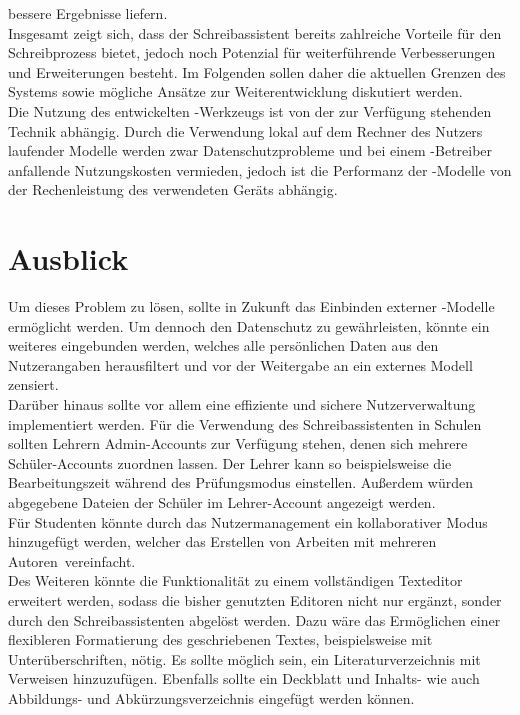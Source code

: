 \documentclass[../main.tex]{subfiles}
\begin{document}
bessere Ergebnisse liefern.\\
Insgesamt zeigt sich, dass der Schreibassistent bereits zahlreiche Vorteile für den Schreibprozess bietet, jedoch noch Potenzial für weiterführende Verbesserungen und Erweiterungen 
besteht. Im Folgenden sollen daher die aktuellen Grenzen des Systems sowie mögliche Ansätze zur Weiterentwicklung diskutiert werden.\\
Die Nutzung des entwickelten -Werkzeugs ist von der zur Verfügung stehenden Technik abhängig. Durch die Verwendung lokal auf dem Rechner des Nutzers laufender Modelle werden zwar 
Datenschutzprobleme und bei einem -Betreiber anfallende Nutzungskosten vermieden, jedoch ist die Performanz der -Modelle von der Rechenleistung des verwendeten Geräts abhängig. 


\section{Ausblick}
Um dieses Problem zu lösen, sollte in Zukunft das Einbinden externer -Modelle ermöglicht werden. Um dennoch den Datenschutz zu gewährleisten, könnte ein weiteres 
eingebunden werden, welches alle persönlichen Daten aus den Nutzerangaben herausfiltert und vor der Weitergabe an ein externes Modell zensiert.\\ 
Darüber hinaus sollte vor allem eine effiziente und sichere Nutzerverwaltung implementiert werden. Für die Verwendung des Schreibassistenten in Schulen sollten Lehrern Admin-Accounts 
zur Verfügung stehen, denen sich mehrere Schüler-Accounts zuordnen lassen. Der Lehrer kann so beispielsweise die Bearbeitungszeit während des Prüfungsmodus einstellen. Außerdem 
würden abgegebene Dateien der Schüler im Lehrer-Account angezeigt werden.\\
Für Studenten könnte durch das Nutzermanagement ein kollaborativer Modus hinzugefügt werden, welcher das Erstellen von Arbeiten mit mehreren \mbox{Autoren vereinfacht.}\\
Des Weiteren könnte die Funktionalität zu einem vollständigen Texteditor erweitert werden, sodass die bisher genutzten Editoren nicht nur ergänzt, sonder durch den Schreibassistenten 
abgelöst werden. Dazu wäre das Ermöglichen einer flexibleren Formatierung des geschriebenen Textes, beispielsweise mit Unterüberschriften, nötig. Es sollte möglich sein, ein 
Literaturverzeichnis mit Verweisen hinzuzufügen. Ebenfalls sollte ein Deckblatt und Inhalts- wie auch Abbildungs- und Abkürzungsverzeichnis eingefügt werden können.
\end{document}
